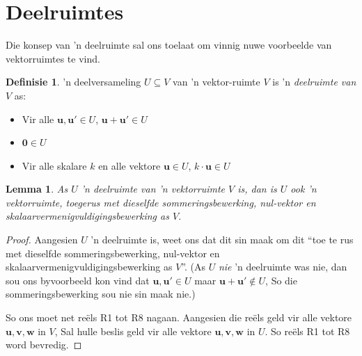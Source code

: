 \documentclass[a4paper,11pt]{book}
\newtheorem{lemma}[theorem]{Lemma}
\theoremstyle{definition}
\newtheorem{definition}[theorem]{Definisie}
\newcommand{\ve}[1]{\mathbf{#1}}
\begin{document}
\section{Deelruimtes}  \label{ACh1Sec6Subspaces}
Die konsep van 'n deelruimte sal ons toelaat om vinnig nuwe voorbeelde van
vektorruimtes te vind.
\begin{definition}'n deelversameling $U \subseteq V$ van 'n vektor-ruimte
	$V$ is 'n \emph{deelruimte van $V$} as:
	\begin{itemize}
		\item Vir alle $\ve{u}, \ve{u}' \in U$, $\ve{u}+\ve{u}' \in U$
		\item $\ve{0} \in U$
		\item Vir alle skalare $k$ en alle vektore $\ve{u} \in U$, $k \cdot
			\ve{u} \in U$
	\end{itemize}
\end{definition}
\begin{lemma} As $U$ 'n deelruimte van 'n vektorruimte $V$ is, dan is $U$
	ook 'n vektorruimte, toegerus met dieselfde sommeringsbewerking,
	nul-vektor en skalaarvermenigvuldigingsbewerking as $V$.
	\label{subspace_lem}
\end{lemma}
\begin{proof} Aangesien $U$ 'n deelruimte is, weet ons dat dit sin maak om
	dit ``toe te rus met dieselfde sommeringsbewerking, nul-vektor en
	skalaarvermenigvuldigingsbewerking as $V$''. (As $U$ \emph{ nie} 'n
	deelruimte was nie, dan sou ons byvoorbeeld kon vind dat $\ve{u},
	\ve{u}' \in U$ maar $\ve{u}+\ve{u}' \notin U$, So die
	sommeringsbewerking sou nie sin maak nie.)

	So ons moet net re{\"e}ls R1 tot R8 nagaan. Aangesien die re{\"e}ls
	geld vir alle vektore $\ve{u}, \ve{v}, \ve{w}$ in $V$, Sal hulle beslis
	geld vir alle vektore $\ve{u}, \ve{v}, \ve{w}$ in $U$. So re{\"e}ls R1
	tot R8 word bevredig.
\end{proof}
\end{document}
